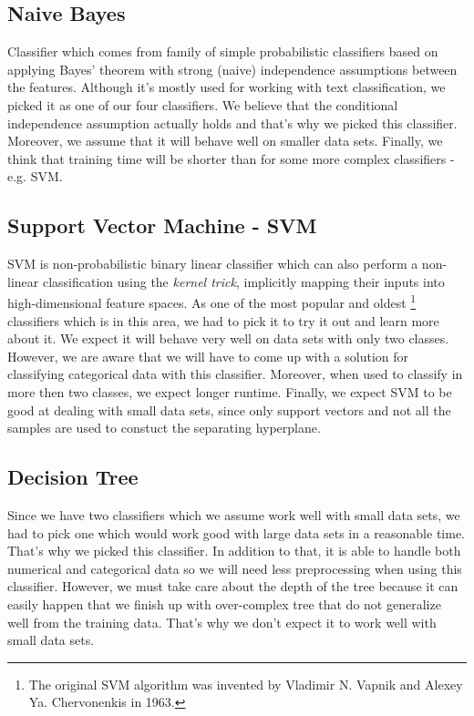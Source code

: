 \documentclass[11pt,a4paper,titlepage]{article}
\begin{document}
\subsection{Naive Bayes}
Classifier which comes from family of simple probabilistic classifiers based on applying Bayes' theorem with strong (naive) independence assumptions between the features. Although it's mostly used for working with text classification, we picked it as one of our four classifiers. We believe that the conditional independence assumption actually holds and that's why we picked this classifier. Moreover, we assume that it will behave well on smaller data sets. Finally, we think that training time will be shorter than for some more complex classifiers - e.g. SVM.

\subsection{Support Vector Machine - SVM}
SVM is non-probabilistic binary linear classifier which can also perform a non-linear classification using the \textit{kernel trick}, implicitly mapping their inputs into high-dimensional feature spaces. As one of the most popular and oldest \footnote{The original SVM algorithm was invented by Vladimir N. Vapnik and Alexey Ya. Chervonenkis in 1963.} classifiers which is in this area, we had to pick it to try it out and learn more about it. We expect it will behave very well on data sets with only two classes. However, we are aware that we will have to come up with a solution for classifying categorical data with this classifier. Moreover, when used to classify in more then two classes, we expect longer runtime. Finally, we expect SVM to be good at dealing with small data sets, since only support vectors and not all the samples are used to constuct the separating hyperplane. 


\subsection{Decision Tree}
Since we have two classifiers which we assume work well with small data sets, we had to pick one which would work good with large data sets in a reasonable time. That's why we picked this classifier. In addition to that, it is able to handle both numerical and categorical data so we will need less preprocessing when using this classifier. However, we must take care about the depth of the tree because it can easily happen that we finish up with over-complex tree that do not generalize well from the training data. That's why we don't expect it to work well with small data sets.
\end{document}
